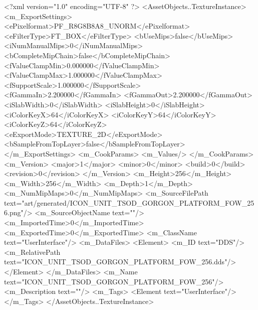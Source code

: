 <?xml version="1.0" encoding="UTF-8" ?>
<AssetObjects..TextureInstance>
	<m_ExportSettings>
		<ePixelformat>PF_R8G8B8A8_UNORM</ePixelformat>
		<eFilterType>FT_BOX</eFilterType>
		<bUseMips>false</bUseMips>
		<iNumManualMips>0</iNumManualMips>
		<bCompleteMipChain>false</bCompleteMipChain>
		<fValueClampMin>0.000000</fValueClampMin>
		<fValueClampMax>1.000000</fValueClampMax>
		<fSupportScale>1.000000</fSupportScale>
		<fGammaIn>2.200000</fGammaIn>
		<fGammaOut>2.200000</fGammaOut>
		<iSlabWidth>0</iSlabWidth>
		<iSlabHeight>0</iSlabHeight>
		<iColorKeyX>64</iColorKeyX>
		<iColorKeyY>64</iColorKeyY>
		<iColorKeyZ>64</iColorKeyZ>
		<eExportMode>TEXTURE_2D</eExportMode>
		<bSampleFromTopLayer>false</bSampleFromTopLayer>
	</m_ExportSettings>
	<m_CookParams>
		<m_Values/>
	</m_CookParams>
	<m_Version>
		<major>1</major>
		<minor>0</minor>
		<build>0</build>
		<revision>0</revision>
	</m_Version>
	<m_Height>256</m_Height>
	<m_Width>256</m_Width>
	<m_Depth>1</m_Depth>
	<m_NumMipMaps>0</m_NumMipMaps>
	<m_SourceFilePath text="art/generated/ICON_UNIT_TSOD_GORGON_PLATFORM_FOW_256.png"/>
	<m_SourceObjectName text=""/>
	<m_ImportedTime>0</m_ImportedTime>
	<m_ExportedTime>0</m_ExportedTime>
	<m_ClassName text="UserInterface"/>
	<m_DataFiles>
		<Element>
			<m_ID text="DDS"/>
			<m_RelativePath text="ICON_UNIT_TSOD_GORGON_PLATFORM_FOW_256.dds"/>
		</Element>
	</m_DataFiles>
	<m_Name text="ICON_UNIT_TSOD_GORGON_PLATFORM_FOW_256"/>
	<m_Description text=""/>
	<m_Tags>
		<Element text="UserInterface"/>
	</m_Tags>
</AssetObjects..TextureInstance>
